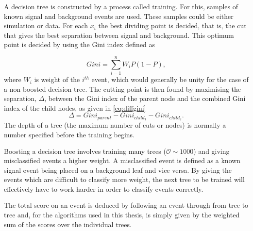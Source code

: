 A decision tree is constructed by a process called training. For this, samples of known signal and background events are used. These samples could be either simulation or data. For each $x_{i}$ the best dividing point is decided, that is, the cut that gives the best separation between signal and background. This optimum point is decided by using the Gini index defined as

\begin{equation}
Gini  = \sum^{n}_{i = 1} W_{i} P(1 - P),
\end{equation}
where $W_{i}$ is weight of the $i^{th}$ event, which would generally be unity for the case of a non-boosted decision tree. 
The cutting point is then found by maximising the separation, $\Delta$, between the Gini index of the parent node and the combined Gini index of the child nodes, as given in \autoref{eq:diffgini} 
\begin{equation}
 \Delta =   Gini_{parent} - Gini_{child_{1}} - Gini_{child_{2}}.
  \label{eq:diffgini}
\end{equation}
The depth of a tree (the maximum number of cuts or nodes) is normally a number specified before the training begins.

Boosting a decision tree involves training many trees ($\mathcal{O} \sim 1000$) and giving misclassified events a higher weight. A misclassified event is defined as a known signal event being placed on a background leaf and vice versa. By giving the events which are difficult to classify more weight, the next tree to be trained will effectively have to work harder in order to classify events correctly. %

The total score on an event is deduced by following an event through from tree to tree and, for the algorithms used in this thesis, is simply given by the weighted sum of the scores over the individual trees.


